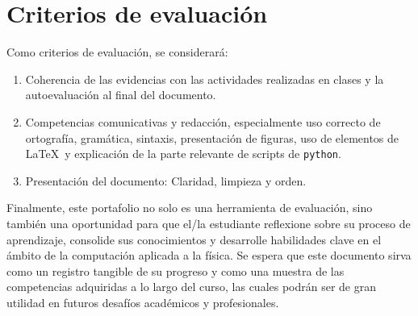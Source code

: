 \documentclass[../portafolio.tex]{subfiles}
\begin{document}
\section*{Criterios de evaluación}
Como criterios de evaluación, se considerará:
\begin{enumerate}
\item Coherencia de las evidencias con las actividades realizadas en clases y la autoevaluación al final del documento.
\item Competencias comunicativas y redacción, especialmente uso
  correcto de ortografía, gramática, sintaxis, presentación de
  figuras, uso de elementos de \LaTeX\ y explicación de la parte
  relevante de scripts de \texttt{python}.
\item Presentación del documento: Claridad, limpieza y orden.
\end{enumerate}

Finalmente, este portafolio no solo es una herramienta de evaluación,
sino también una oportunidad para que el/la estudiante reflexione
sobre su proceso de aprendizaje, consolide sus conocimientos y
desarrolle habilidades clave en el ámbito de la computación aplicada a
la física. Se espera que este documento sirva como un registro
tangible de su progreso y como una muestra de las competencias
adquiridas a lo largo del curso, las cuales podrán ser de gran
utilidad en futuros desafíos académicos y profesionales.
\end{document}
